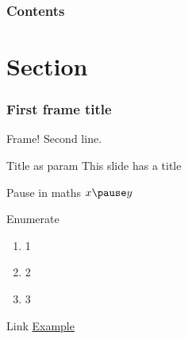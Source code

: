 \documentclass{beamer}
\begin{document}
\begin{frame}
    \frametitle{Contents}
    \tableofcontents
\end{frame}

\section{Section}

\begin{frame}
    \frametitle{First frame title}
    Frame!
    \pause
    Second line.
\end{frame}

\begin{frame}{Title as param}
    This slide has a title
\end{frame}

\begin{frame}{Pause in maths}
    $x \pause y$
\end{frame}

\begin{frame}{Enumerate}
    \begin{enumerate}
        \item 1
        \item 2
        \item 3
    \end{enumerate}
\end{frame}

\begin{frame}{Link}
    \href{https://example.com}{Example}
\end{frame}
\end{document}
